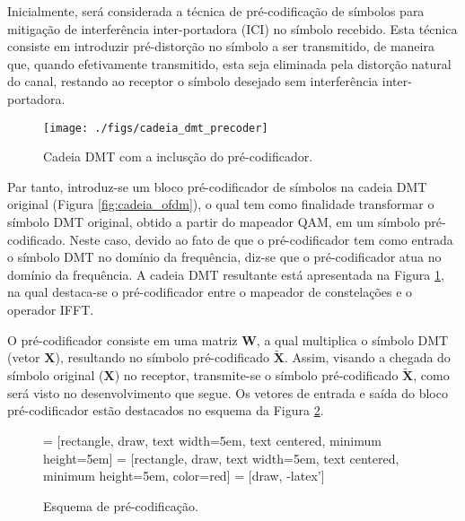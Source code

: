 Inicialmente, será considerada a técnica de pré-codificação de símbolos para mitigação de interferência inter-portadora (ICI) no símbolo recebido. Esta técnica consiste em introduzir pré-distorção no símbolo a ser transmitido, de maneira que, quando efetivamente transmitido, esta seja eliminada pela distorção natural do canal, restando ao receptor o símbolo desejado sem interferência inter-portadora.

\begin{figure}[htbp]
\centering
\texttt{[image: ./figs/cadeia\_dmt\_precoder]}
\caption{Cadeia DMT com a inclusção do pré-codificador.
\label{fig:cadeia_dmt_prec}}
\end{figure}

Par tanto, introduz-se um bloco pré-codificador de símbolos na cadeia DMT original (Figura \ref{fig:cadeia_ofdm}), o qual tem como finalidade transformar o símbolo DMT original, obtido a partir do mapeador QAM, em um símbolo pré-codificado. Neste caso, devido ao fato de que o pré-codificador tem como entrada o símbolo DMT no domínio da frequência, diz-se que o pré-codificador atua no domínio da frequência. A cadeia DMT resultante está apresentada na Figura \ref{fig:cadeia_dmt_prec}, na qual destaca-se o pré-codificador entre o mapeador de constelações e o operador IFFT. 

O pré-codificador consiste em uma matriz $\mathbf{W}$, a qual multiplica o símbolo DMT (vetor $\mathbf{X}$), resultando no símbolo pré-codificado $\tilde{\mathbf{X}}$. Assim, visando a chegada do símbolo original ($\mathbf{X}$) no receptor, transmite-se o símbolo pré-codificado $\tilde{\mathbf{X}}$, como será visto no desenvolvimento que segue. Os vetores de entrada e saída do bloco pré-codificador estão destacados no esquema da Figura \ref{fig:pre_codificador}. 

\begin{figure}[htbp]
\centering
{} = [rectangle, draw, text width=5em, text centered, minimum height=5em]
 = [rectangle, draw, text width=5em, text centered, minimum height=5em, color=red]
 = [draw, -latex']
\caption{Esquema de pré-codificação.
\label{fig:pre_codificador}}
\end{figure}

